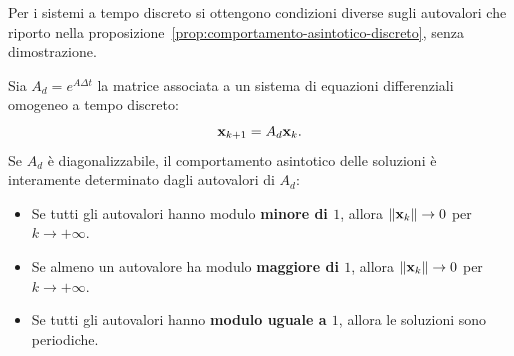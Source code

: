Per i sistemi a tempo discreto si ottengono condizioni diverse sugli autovalori
che riporto nella proposizione~\ref{prop:comportamento-asintotico-discreto}, senza
dimostrazione.
\begin{prop}
    Sia $A_d = e^{A\Delta t}$ la matrice associata a un sistema di equazioni differenziali omogeneo
    a tempo discreto:
    \begin{equation*}
        \mathbf{x}_{k+1} = A_d \mathbf{x}_k.
    \end{equation*}
    Se $A_d$ è diagonalizzabile, il comportamento asintotico delle soluzioni è interamente
    determinato dagli autovalori di $A_d$:
    \begin{itemize}
        \item Se tutti gli autovalori hanno modulo \textbf{minore di $1$}, allora $\lVert\mathbf{x}_k\rVert \to 0$ per $k \to +\infty$.%
        \item Se almeno un autovalore ha modulo \textbf{maggiore di $1$}, allora $\lVert\mathbf{x}_k\rVert \to 0$ per $k \to +\infty$.%
        \item Se tutti gli autovalori hanno \textbf{modulo uguale a $1$}, allora le soluzioni sono periodiche.
    \end{itemize}
    \label{prop:comportamento-asintotico-discreto}
\end{prop}